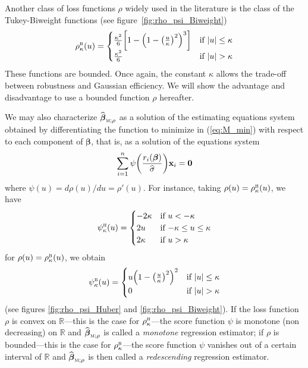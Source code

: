 Another class of loss functions $\rho$ widely used in the literature is the
class of the Tukey-Biweight                                                      
functions (see figure~\ref{fig:rho_psi_Biweight})
%
\begin{equation}
    \label{eq:Tukey_Biweight_function}
    \rho_{\kappa}^{\stsc{B}}(u) = 
        \begin{cases}
            \frac{\kappa^{2}}{6} \left[1 - \left(1 - \left(\frac{u}{\kappa}\right)^{2}\right)^{3}\right] 
                & \text{if $|u| \leq \kappa$}\\
            \frac{\kappa^{2}}{6} 
                & \text{if $|u| > \kappa$}
        \end{cases}
\end{equation}
%
These functions are bounded. Once again, the constant $\kappa$ allows the
trade-off between robustness and Gaussian efficiency. We will show the
advantage and disadvantage to use a bounded function $\rho$ hereafter.

We may also characterize $\sthat{\boldsymbol\beta}_{\stsc{M};\rho}$ as a
solution of the estimating equations system obtained by differentiating the
function to minimize in (\ref{eq:M_min}) with respect to each component of
$\boldsymbol\beta$, that is, as a solution of the equations system
%
\begin{equation}\label{eq:M_equations}
    \sum_{i=1}^{n} \psi\left(\frac{r_{i}(\boldsymbol\beta)}{\sthat{\sigma}}\right) \stvec{x}_{i} = \stvec{0}
\end{equation}
%
where $\psi(u) = d\rho(u) / du = \rho'(u)$. For instance, taking
$\rho(u)=\rho_{\kappa}^{\stsc{H}}(u)$, we have
\[
    \psi_{\kappa}^{\stsc{H}}(u) = 
    \begin{cases}
        -2\kappa    & \text{if $u<-\kappa$}\\
        2u          & \text{if $-\kappa\leq u\leq\kappa$}\\
        2\kappa     & \text{if $u>\kappa$}
    \end{cases}
\]
for $\rho(u) = \rho_{\kappa}^{\stsc{B}}(u)$, we obtain
\[
    \psi_{\kappa}^{\stsc{B}}(u) =
    \begin{cases}
        u\left(1 - \left(\frac{u}{\kappa}\right)^{2}\right)^{2} & \text{if $|u| \leq \kappa$}\\
        0                                                       & \text{if $|u| > \kappa$}
    \end{cases}
\]
(see figures \ref{fig:rho_psi_Huber} and \ref{fig:rho_psi_Biweight}). If the
loss function $\rho$ is convex on $\mathbb{R}$---this is the case for
$\rho_{\kappa}^{\stsc{H}}$---the score function $\psi$ is monotone (non
decreasing) on $\mathbb{R}$ and $\sthat{\boldsymbol\beta}_{\stsc{M};\rho}$ is
called a \emph{monotone} regression  estimator; if $\rho$ is
bounded---this is the case for $\rho_{\kappa}^{\stsc{B}}$---the score function
$\psi$ vanishes out of a certain interval of $\mathbb{R}$ and
$\sthat{\boldsymbol\beta}_{\stsc{M};\rho}$ is then called a \emph{redescending}
regression  estimator.


